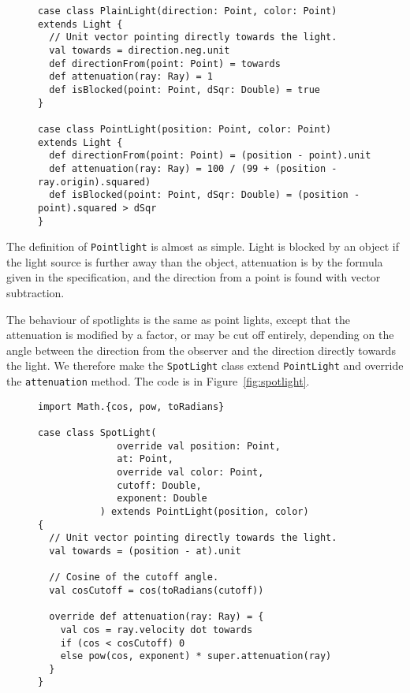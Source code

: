 \begin{figure}
\begin{verbatim}
case class PlainLight(direction: Point, color: Point) extends Light {
  // Unit vector pointing directly towards the light.
  val towards = direction.neg.unit
  def directionFrom(point: Point) = towards
  def attenuation(ray: Ray) = 1
  def isBlocked(point: Point, dSqr: Double) = true
}

case class PointLight(position: Point, color: Point) extends Light {
  def directionFrom(point: Point) = (position - point).unit
  def attenuation(ray: Ray) = 100 / (99 + (position - ray.origin).squared)
  def isBlocked(point: Point, dSqr: Double) = (position - point).squared > dSqr
}
\end{verbatim}
\getcaption
\end{figure}

The definition of \verb!Pointlight! is almost as simple.
Light is blocked by an object if
the light source is further away than the object,
attenuation is by the formula given in the specification,
and the direction from a point is found with vector subtraction.

The behaviour of spotlights is the same as point lights,
except that the attenuation is modified by a factor,
or may be cut off entirely,
depending on the angle between the direction from the observer
and the direction directly towards the light.
We therefore make the \verb!SpotLight! class extend \verb!PointLight!
and override the \verb!attenuation! method.
The code is in Figure~\ref{fig:spotlight}.

\begin{figure}
\begin{verbatim}
import Math.{cos, pow, toRadians}

case class SpotLight(
              override val position: Point,
              at: Point,
              override val color: Point,
              cutoff: Double,
              exponent: Double
           ) extends PointLight(position, color)
{
  // Unit vector pointing directly towards the light.
  val towards = (position - at).unit

  // Cosine of the cutoff angle.
  val cosCutoff = cos(toRadians(cutoff))

  override def attenuation(ray: Ray) = {
    val cos = ray.velocity dot towards
    if (cos < cosCutoff) 0
    else pow(cos, exponent) * super.attenuation(ray)
  }
}
\end{verbatim}
\getcaption
\end{figure}

